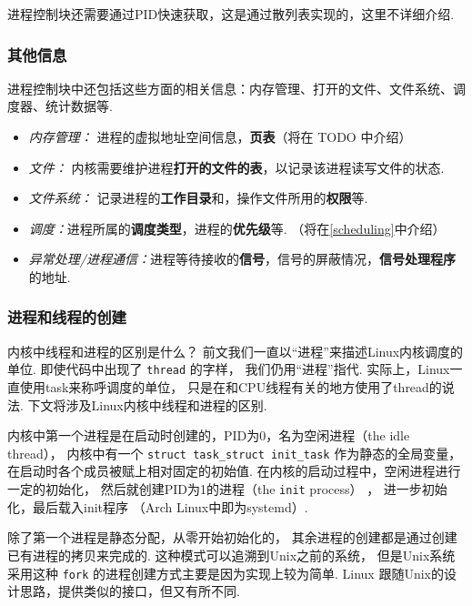 进程控制块还需要通过PID快速获取，这是通过散列表实现的，这里不详细介绍.

\subsubsection{其他信息}
进程控制块中还包括这些方面的相关信息：内存管理、打开的文件、文件系统、调度器、统计数据等.

\begin{itemize}
	\item\textit{内存管理：} 进程的虚拟地址空间信息，\textbf{页表}（将在 TODO 中介绍）
	\item \textit{文件：} 内核需要维护进程\textbf{打开的文件的表}，以记录该进程读写文件的状态.
	\item \textit{文件系统：} 记录进程的\textbf{工作目录}和，操作文件所用的\textbf{权限}等.
	\item \textit{调度：}进程所属的\textbf{调度类型}，进程的\textbf{优先级}等.
	      （将在\ref{scheduling}中介绍）
	\item \textit{异常处理/进程通信：}进程等待接收的\textbf{信号}，信号的屏蔽情况，\textbf{信号处理程序}的地址.
\end{itemize}

\subsubsection{进程和线程的创建} \label{creating task}

\begin{qbox}{内核中线程和进程的区别是什么？}
	前文我们一直以“进程”来描述Linux内核调度的单位.
	即使代码中出现了 \lstinline{thread} 的字样，
	我们仍用“进程”指代.
	实际上，Linux一直使用task来称呼调度的单位，
	只是在和CPU线程有关的地方使用了thread的说法.
	下文将涉及Linux内核中线程和进程的区别.
\end{qbox}

内核中第一个进程是在启动时创建的，PID为0，名为空闲进程（the idle thread），
内核中有一个 \lstinline{struct task_struct init_task}
作为静态的全局变量，在启动时各个成员被赋上相对固定的初始值.
在内核的启动过程中，空闲进程进行一定的初始化，
然后就创建PID为1的进程（the \lstinline{init} process）%
，
进一步初始化，最后载入init程序\cite{bovet2005understanding}
（Arch Linux中即为systemd）.

除了第一个进程是静态分配，从零开始初始化的，
其余进程的创建都是通过创建已有进程的拷贝来完成的.
这种模式可以追溯到Unix之前的系统，
但是Unix系统采用这种 \lstinline{fork} 
的进程创建方式主要是因为实现上较为简单.\cite{ritchie1979evolution}
Linux 跟随Unix的设计思路，提供类似的接口，但又有所不同.

